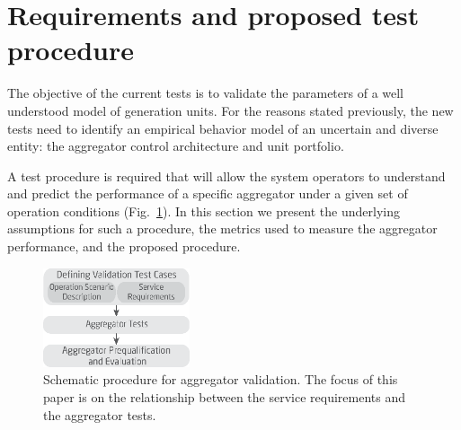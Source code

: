 \section{Requirements and proposed test  procedure}\label{sec:metrics}

The objective of the current tests is to validate the parameters of a well understood model of generation units. For the reasons stated previously, the new tests need to identify an empirical behavior model of an uncertain and diverse entity: the aggregator control architecture and unit portfolio. 

A test procedure is required that will allow the system operators to understand and predict the performance of a specific aggregator under a given set of operation conditions (Fig.~\ref{fig:framework}). In this section we present the underlying assumptions for such a procedure, the metrics used to measure the aggregator performance, and the proposed procedure.

\begin{figure}[!t]
\centering
\includegraphics[width=1.7in]{graphics/pscc2016/validation.eps}
\caption{Schematic procedure for aggregator validation. The focus of this paper is on the relationship between the service requirements and the aggregator tests.}
\label{fig:framework}
\end{figure}



